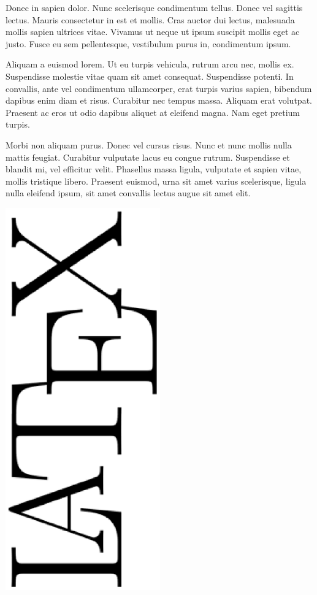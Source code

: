 Donec in sapien dolor. Nunc scelerisque condimentum tellus. Donec vel sagittis lectus. Mauris consectetur in est et mollis. Cras auctor dui lectus, malesuada mollis sapien ultrices vitae. Vivamus ut neque ut ipsum suscipit mollis eget ac justo. Fusce eu sem pellentesque, vestibulum purus in, condimentum ipsum.

Aliquam a euismod lorem. Ut eu turpis vehicula, rutrum arcu nec, mollis ex. Suspendisse molestie vitae quam sit amet consequat. Suspendisse potenti. In convallis, ante vel condimentum ullamcorper, erat turpis varius sapien, bibendum dapibus enim diam et risus. Curabitur nec tempus massa. Aliquam erat volutpat. Praesent ac eros ut odio dapibus aliquet at eleifend magna. Nam eget pretium turpis.

Morbi non aliquam purus. Donec vel cursus risus. Nunc et nunc mollis nulla mattis feugiat. Curabitur vulputate lacus eu congue rutrum. Suspendisse et blandit mi, vel efficitur velit. Phasellus massa ligula, vulputate et sapien vitae, mollis tristique libero. Praesent euismod, urna sit amet varius scelerisque, ligula nulla eleifend ipsum, sit amet convallis lectus augue sit amet elit.

\includegraphics[angle=20,width=0.5\textwidth]{figures/latex.eps}


